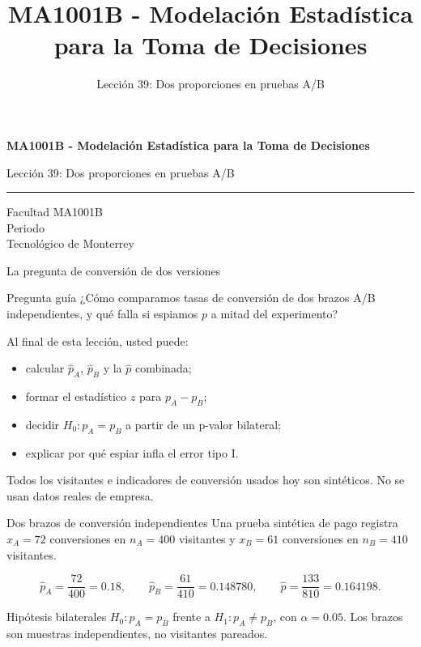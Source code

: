 \documentclass[aspectratio=169,10pt,spanish]{beamer}
\title{MA1001B - Modelación Estadística para la Toma de Decisiones}
\subtitle{Lección 39: Dos proporciones en pruebas A/B}
\author{}
\institute{Tecnol\'ogico de Monterrey}
\date{}
\begin{document}
\begin{frame}[plain]
  \vspace{1.2cm}
  {\Large\bfseries MA1001B - Modelación Estadística para la Toma de Decisiones\par}
  \vspace{0.7cm}
  {\large Lección 39: Dos proporciones en pruebas A/B\par}
  \vspace{0.7cm}
  {\color{TecRojo}\rule{\textwidth}{1.2pt}}
  \vspace{0.8cm}

  Facultad MA1001B\\[0.3cm]
  Periodo\\[0.3cm]
  Tecnol\'ogico de Monterrey
\end{frame}

\begin{frame}{La pregunta de conversión de dos versiones}
  \begin{alertblock}{Pregunta guía}
    ¿Cómo comparamos tasas de conversión de dos brazos A/B independientes, y
    qué falla si espiamos $p$ a mitad del experimento?
  \end{alertblock}

  \vspace{0.6em}
  Al final de esta lección, usted puede:
  \begin{itemize}
    \item calcular $\hat{p}_A$, $\hat{p}_B$ y la $\hat{p}$ combinada;
    \item formar el estadístico $z$ para $p_A-p_B$;
    \item decidir $H_0:p_A=p_B$ a partir de un p-valor bilateral;
    \item explicar por qué espiar infla el error tipo I.
  \end{itemize}

  \vfill
  \scriptsize Todos los visitantes e indicadores de conversión usados hoy son sintéticos. No se usan datos reales de empresa.
\end{frame}

\begin{frame}{Dos brazos de conversión independientes}
  \small
  Una prueba sintética de pago registra $x_A=72$ conversiones en $n_A=400$
  visitantes y $x_B=61$ conversiones en $n_B=410$ visitantes.

  \[
    \hat{p}_A=\frac{72}{400}=0.18,\qquad
    \hat{p}_B=\frac{61}{410}=0.148780,\qquad
    \hat{p}=\frac{133}{810}=0.164198.
  \]

  \begin{exampleblock}{Hipótesis bilaterales}
    $H_0:p_A=p_B$ frente a $H_1:p_A\neq p_B$, con $\alpha=0.05$. Los brazos
    son muestras independientes, no visitantes pareados.
  \end{exampleblock}
\end{frame}
\end{document}
